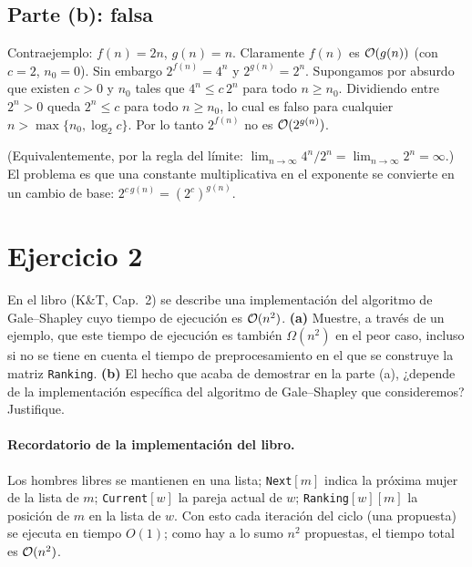 \subsection*{Parte (b): falsa}
Contraejemplo: $f(n)=2n$, $g(n)=n$. Claramente $f(n)$ es $\mathcal{O}(g(n))$ (con $c=2$, $n_0=0$).
Sin embargo $2^{f(n)}=4^n$ y $2^{g(n)}=2^n$. Supongamos por absurdo que existen $c>0$ y $n_0$
tales que $4^n\le c\,2^n$ para todo $n\ge n_0$. Dividiendo entre $2^n>0$ queda $2^n\le c$
para todo $n\ge n_0$, lo cual es falso para cualquier $n>\max\{n_0,\log_2 c\}$. Por lo tanto
$2^{f(n)}$ no es $\mathcal{O}(2^{g(n)})$.

(Equivalentemente, por la regla del límite: $\lim_{n\to\infty} 4^n/2^n=\lim_{n\to\infty}2^n=\infty$.)
El problema es que una constante multiplicativa en el exponente se convierte en un cambio de
base: $2^{c\,g(n)}=(2^c)^{g(n)}$.

\section{Ejercicio 2}

\begin{enunciado}
En el libro (K\&T, Cap.~2) se describe una implementación del algoritmo de Gale--Shapley cuyo
tiempo de ejecución es $\mathcal{O}(n^2)$.
\textbf{(a)} Muestre, a través de un ejemplo, que este tiempo de ejecución es también
$\Omega(n^2)$ en el peor caso, incluso si no se tiene en cuenta el tiempo de preprocesamiento en
el que se construye la matriz \texttt{Ranking}.
\textbf{(b)} El hecho que acaba de demostrar en la parte (a), ¿depende de la implementación
específica del algoritmo de Gale--Shapley que consideremos? Justifique.
\end{enunciado}


\paragraph{Recordatorio de la implementación del libro.} Los hombres libres se mantienen en una
lista; \texttt{Next}$[m]$ indica la próxima mujer de la lista de $m$; \texttt{Current}$[w]$ la
pareja actual de $w$; \texttt{Ranking}$[w][m]$ la posición de $m$ en la lista de $w$. Con
esto cada iteración del ciclo (una propuesta) se ejecuta en tiempo $O(1)$; como hay a lo sumo
$n^2$ propuestas, el tiempo total es $\mathcal{O}(n^2)$.

